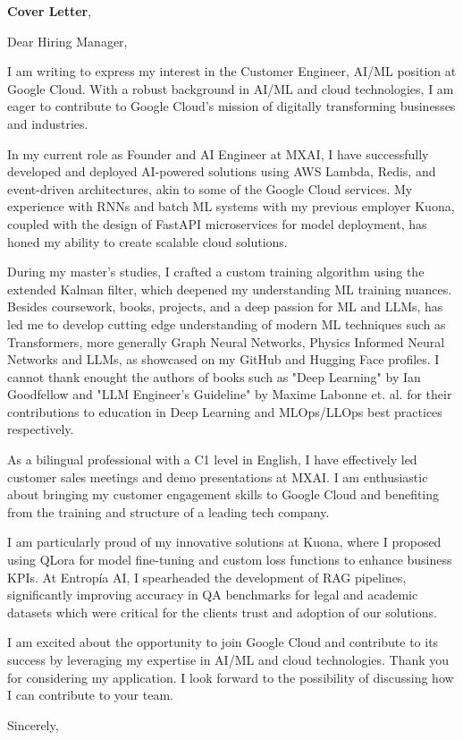 \documentclass[11pt,a4paper,roman]{moderncv}
\begin{document}
\date{\today}
\opening{\textbf{Cover Letter}, \vspace{-1em}}

\makelettertitle

Dear Hiring Manager,

I am writing to express my interest in the Customer Engineer, 
AI/ML position at Google Cloud. With a robust background in 
AI/ML and cloud technologies, I am eager to contribute to Google 
Cloud's mission of digitally transforming businesses and industries.

In my current role as Founder and AI Engineer at MXAI, I have 
successfully developed and deployed AI-powered solutions using 
AWS Lambda, Redis, and event-driven architectures, akin to some of the 
Google Cloud services. My experience with RNNs and batch ML systems 
with my previous employer Kuona, 
coupled with the design of FastAPI microservices for model deployment, 
has honed my ability to create scalable cloud solutions.

During my master's studies, I crafted a custom training algorithm using 
the extended Kalman filter, which deepened my understanding ML training 
nuances. Besides coursework, books, projects, and a deep 
passion for ML and LLMs, has led me to 
develop cutting edge understanding of modern ML techniques such as 
Transformers, more generally Graph Neural Networks, Physics Informed 
Neural Networks and LLMs, as showcased on my GitHub and Hugging Face 
profiles. I cannot thank enought the authors of books such as 
"Deep Learning" by Ian Goodfellow 
and "LLM Engineer's Guideline" by Maxime Labonne et. al. for their 
contributions to education in Deep Learning and MLOps/LLOps best 
practices respectively.

As a bilingual professional with a C1 level in English, 
I have effectively led customer sales meetings and demo 
presentations at MXAI. I am enthusiastic about bringing my customer 
engagement skills to Google Cloud and benefiting from the 
training and structure of a leading tech company.

I am particularly proud of my innovative solutions at Kuona, 
where I proposed using QLora for model fine-tuning and custom 
loss functions to enhance business KPIs. At Entropía AI, I 
spearheaded the development of RAG pipelines, significantly 
improving accuracy in QA benchmarks for legal and academic 
datasets which were critical 
for the clients trust and adoption of our solutions.

I am excited about the opportunity to join Google Cloud and 
contribute to its success by leveraging my expertise in AI/ML 
and cloud technologies. Thank you for considering my application. 
I look forward to the possibility of discussing how I can 
contribute to your team.

Sincerely,
\makeletterclosing
\end{document}
